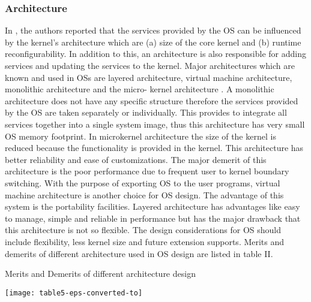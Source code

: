 \documentclass[12pt,journal,communications surveys and tutorials]{IEEEtran}
\begin{document}
\subsubsection{Architecture }
In \cite{phani2007operating}, the authors reported that the services provided by the OS can be influenced by the kernel's architecture which are (a) size of the core kernel and (b) runtime reconfigurability.  In addition to this, an architecture is also responsible for adding services and updating the services to the kernel.  Major architectures which are known and used in OSs are layered architecture, virtual machine architecture, monolithic architecture and the micro- kernel architecture \cite{levis2005tinyos,1563113,cao2008liteos,1367266}. A monolithic architecture does not have any specific structure therefore the services provided by the OS are taken separately or individually. This provides to integrate all services together into a single system image, thus this architecture has very small OS memory footprint. In microkernel architecture the size of the kernel is reduced because the functionality is provided in the kernel. This architecture has better reliability and ease of customizations. The major demerit of this architecture is the poor performance due to frequent user to kernel boundary switching. With the purpose of exporting OS to the user programs, virtual machine architecture is another choice for OS design. The advantage of this system is the portability facilities.  Layered architecture has advantages like easy to manage, simple and reliable in performance but has the major drawback that this architecture is not so flexible. The design considerations for OS should include flexibility, less kernel size and future extension supports. Merits and demerits of different architecture used in OS design are listed in table II.
 \begin{table}\caption{Merits and Demerits of different architecture design\label{tab:table5-eps-converted-to}}
 {\texttt{[image: table5-eps-converted-to]}}
 \end{table}
\end{document}
